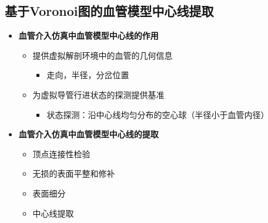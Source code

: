 \subsection[中心线提取]{基于Voronoi图的血管模型中心线提取}

\begin{frame}
\begin{itemize}
\item \textbf{血管介入仿真中血管模型中心线的作用}
\begin{itemize}
\pause \item 提供虚拟解剖环境中的血管的几何信息
\begin{itemize}
\item 走向，半径，分岔位置
\end{itemize}
\pause \item 为虚拟导管行进状态的探测提供基准
\begin{itemize}
\item 状态探测：沿中心线均匀分布的空心球（半径小于血管内径）
\end{itemize}
\end{itemize}
\pause \item \textbf{血管介入仿真中血管模型中心线的提取}
\begin{itemize}
\pause \item 顶点连接性检验
\pause \item 无损的表面平整和修补
\pause \item 表面细分
\pause \item 中心线提取
\end{itemize}
\end{itemize}
\end{frame}

